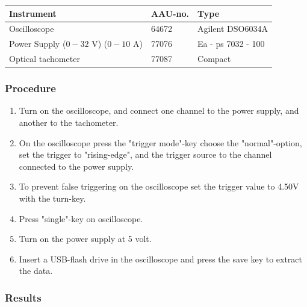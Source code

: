 \begin{table}[H]
\begin{tabular}{|l|l|p{4cm}|}
\hline%
  \textbf{Instrument}                        &  \textbf{AAU-no.}  &  \textbf{Type}       \\
\hline%
  Oscilloscope                               &  64672             &  Agilent DSO6034A    \\
\hline%
  Power Supply ($0 - 32$ V) ($0 - 10$ A)     &  77076             &  Ea - ps 7032 - 100  \\
\hline%
  Optical tachometer                         &  77087             &  Compact             \\
\hline%
\end{tabular}
\end{table}

\subsubsection{Procedure}

\begin{enumerate}
  \item Turn on the oscilloscope, and connect one channel to the power supply, and another to the tachometer.
  \item On the oscilloscope press the "trigger mode"-key choose the "normal"-option, set the trigger to "rising-edge", and the trigger source to the channel connected to the power supply.
  \item To prevent false triggering on the oscilloscope set the trigger value to \num{4,50}V with the turn-key.
  \item Press "single"-key on oscilloscope.
  \item Turn on the power supply at 5 volt.
  \item Insert a USB-flash drive in the oscilloscope and press the save key to extract the data.
\end{enumerate}

\subsubsection{Results}

